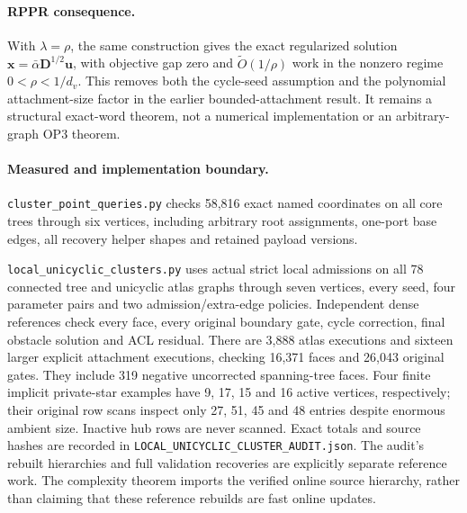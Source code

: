 \paragraph{RPPR consequence.}
With $\lambda=\rho$, the same construction gives the exact regularized
solution $\boldsymbol x=\bar\alpha\boldsymbol D^{1/2}\boldsymbol u$,
with objective gap zero and $\widetilde O(1/\rho)$ work in the nonzero
regime $0<\rho<1/d_v$. This removes both the cycle-seed assumption and the
polynomial attachment-size factor in the earlier bounded-attachment result.
It remains a structural exact-word theorem, not a numerical implementation
or an arbitrary-graph OP3 theorem.

\paragraph{Measured and implementation boundary.}
\texttt{cluster\_point\_queries.py} checks 58,816 exact named coordinates
on all core trees through six vertices, including arbitrary root assignments,
one-port base edges, all recovery helper shapes and retained payload versions.

\texttt{local\_unicyclic\_clusters.py} uses actual strict local admissions on
all 78 connected tree and unicyclic atlas graphs through seven vertices,
every seed, four parameter pairs and two admission/extra-edge policies.
Independent dense references check every face, every original boundary
gate, cycle correction, final obstacle solution and ACL residual. There are
3,888 atlas executions and sixteen larger explicit attachment executions,
checking 16,371 faces and 26,043 original gates. They include 319 negative
uncorrected spanning-tree faces. Four finite implicit private-star examples
have 9, 17, 15 and 16 active vertices, respectively; their original row
scans inspect only 27, 51, 45 and 48 entries despite enormous ambient size.
Inactive hub rows are never scanned. Exact totals and source hashes are
recorded in \texttt{LOCAL\_UNICYCLIC\_CLUSTER\_AUDIT.json}.
The audit's rebuilt hierarchies and full validation recoveries are explicitly
separate reference work. The complexity theorem imports the verified online
source hierarchy, rather than claiming that these reference rebuilds are
fast online updates.
